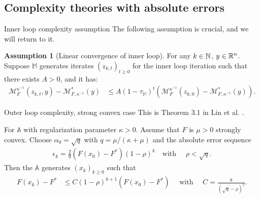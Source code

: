 \documentclass[11pt]{beamer}
\theoremstyle{definition}
\newtheorem{assumption}{Assumption}[section]
\begin{document}
    \subsection{Complexity theories with absolute errors}
        \begin{frame}{Inner loop complexity assumption}
            The following assumption is crucial, and we will return to it. 
            \begin{assumption}[Linear convergence of inner loop]\label{ass:linear-convergence-inner-loop}
                For any $k \in \mathbb N$, $y \in \mathbb R^n$. 
                Suppose $\mathbb M$ generates iterates $(z_{k, t})_{t \ge 0}$ for the inner loop iteration such that there exists $A > 0$, and it has: 
                {\small
                \begin{align*}
                    \mathcal M_F^{\kappa^{-1}}(z_{k, t}, y) - \mathcal M^*_{F, \kappa^{-1}}(y) 
                    &\le 
                    A(1 - \tau_{\mathbb M})^t
                    \left(
                        \mathcal M_{F}^{\kappa^{-1}}(z_{k,0})
                        -
                        \mathcal M^*_{F, \kappa^{-1}}(y)
                    \right). 
                \end{align*}
                }
            \end{assumption}
        \end{frame}
        \begin{frame}{Outer loop complexity, strong convex case}
            This is Theorem 3.1 in Lin et al. \cite{lin_universal_2015}. 
            \begin{theorem}[]\label{thm:err-seq-outer-s-cnvx}
            {\small
                For $\mathbb A$ with regularization parameter $\kappa > 0$. 
                Assume that $F$ is $\mu > 0$ strongly convex. 
                Choose $\alpha_0 = \sqrt{q}$ with $q = \mu/(\kappa + \mu)$ and the absolute error sequence 
                $$
                \begin{aligned}
                    \epsilon_k = \frac{2}{9}(F(x_0) - F^*)(1 - \rho)^k \quad \text{with }\quad 
                    \rho < \sqrt{q}. 
                \end{aligned}
                $$
                Then the $\mathbb A$ generates $(x_{k})_{k \ge 0}$ such that 
                $$
                \begin{aligned}
                    F(x_k) - F^* &\le 
                    C(1 - \rho)^{k + 1} (F(x_0) - F^*) \quad \text{ with }\quad 
                    C = \frac{8}{(\sqrt{q} - \rho)^2}. 
                \end{aligned}
                $$
            }
            \end{theorem}
        \end{frame}
\end{document}
